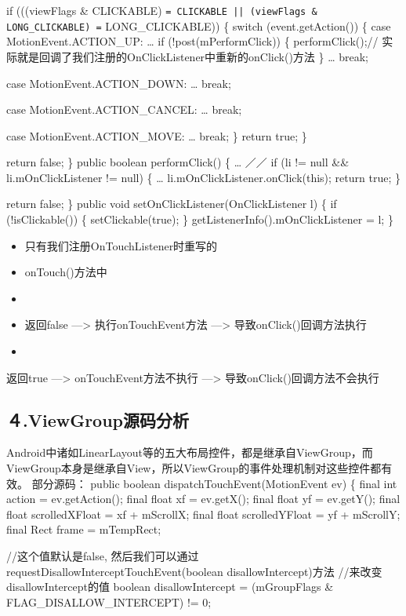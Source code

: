 \documentclass[9pt, b5paper]{article}
\begin{document}
if (((viewFlags \& CLICKABLE) \texttt{= CLICKABLE ||  
            (viewFlags \& LONG\_CLICKABLE) =} LONG\_CLICKABLE)) \{
    switch (event.getAction()) \{
        case MotionEvent.ACTION\_UP:
            \ldots{}
                        if (!post(mPerformClick)) \{
                            performClick();// 实际就是回调了我们注册的OnClickListener中重新的onClick()方法
                        \}
             \ldots{}
            break;

case MotionEvent.ACTION\_DOWN:
   \ldots{}
    break;

case MotionEvent.ACTION\_CANCEL:
    \ldots{}
    break;

        case MotionEvent.ACTION\_MOVE:
           \ldots{}
            break;
    \}
    return true;
\}

    return false;
\}
public boolean performClick() \{
    \ldots{}
 ／／
    if (li != null \&\& li.mOnClickListener != null) \{
        \ldots{}
        li.mOnClickListener.onClick(this);
        return true;
    \}

    return false;
\}
 public void setOnClickListener(OnClickListener l) \{
    if (!isClickable()) \{
        setClickable(true);
    \}
    getListenerInfo().mOnClickListener = l;
\}
\begin{itemize}
\item 只有我们注册OnTouchListener时重写的
\item onTouch()方法中
\item 
\item 返回false  —> 执行onTouchEvent方法 —>  导致onClick()回调方法执行　
\item 
\end{itemize}
返回true —> onTouchEvent方法不执行 —>  导致onClick()回调方法不会执行

\subsection{４.ViewGroup源码分析}
\label{sec-12-4}
Android中诸如LinearLayout等的五大布局控件，都是继承自ViewGroup，而ViewGroup本身是继承自View，所以ViewGroup的事件处理机制对这些控件都有效。
部分源码：
public boolean dispatchTouchEvent(MotionEvent ev) \{  
       final int action = ev.getAction();  
       final float xf = ev.getX();  
       final float yf = ev.getY();  
       final float scrolledXFloat = xf + mScrollX;  
       final float scrolledYFloat = yf + mScrollY;  
       final Rect frame = mTempRect;  

//这个值默认是false, 然后我们可以通过requestDisallowInterceptTouchEvent(boolean disallowIntercept)方法  
//来改变disallowIntercept的值  
boolean disallowIntercept = (mGroupFlags \& FLAG\_DISALLOW\_INTERCEPT) != 0;  
\end{document}
